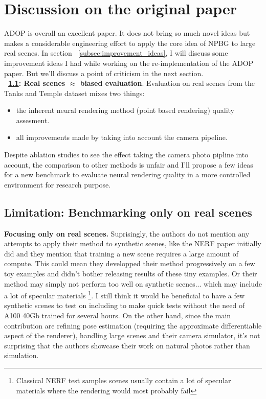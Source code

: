 \section{Discussion on the original paper}
\label{sec:discussion}
ADOP\cite{Aruckert2022adop} is overall an excellent paper. It does not bring so much novel ideas but makes a considerable engineering effort to apply the core idea of NPBG \cite{Aliev2020} to large real scenes.
In section ~\ref{subsec:improvement_ideas}, I will discuss some improvement ideas I had while working on the re-implementation of the ADOP paper. But we'll discuss a point of criticism in the next section.\\
\noindent \textbf{~\ref{subsec:limits_real_scenes}{: Real scenes $\approx$ biased evaluation}}. Evaluation on real scenes from the Tanks and Temple dataset \cite{Knapitsch2017TanksAndTemples} mixes two things:
\begin{itemize}
    \item the inherent neural rendering method (point based rendering) quality assesment.
    \item all improvements made by taking into account the camera pipeline.
\end{itemize}
Despite ablation studies to see the effect taking the camera photo pipline into account, the comparison to other methods is unfair and I'll propose a few ideas for a new benchmark to evaluate neural rendering quality in a more controlled environment for research purpose.

\subsection{Limitation: Benchmarking only on real scenes}
\label{subsec:limits_real_scenes}
\noindent \textbf{Focusing only on real scenes.}
Suprisingly, the authors do not mention any attempts to apply their method to synthetic scenes, like the NERF paper initially did and they mention that training a new scene requires a large amount of compute. This could mean they developped their method progressively on a few toy examples and didn't bother releasing results of these tiny examples. Or their method may simply not perform too well on synthetic scenes... which may include a lot of specular materials \footnote{Classical NERF test samples scenes usually contain a lot of specular materials where the rendering would most probably fail}. I still think it would be beneficial to have a few synthetic scenes to test on including to make quick tests without the need of A100 40Gb trained for several hours.
On the other hand, since the main contribution are refining pose estimation (requiring the approximate differentiable aspect of the renderer), handling large scenes and their camera simulator, it's not surprising that the authors showcase their work on natural photos rather than simulation. 

